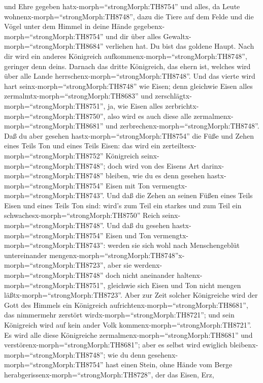 und Ehre gegeben hatx-morph=``strongMorph:TH8754''  und
alles, da Leute wohnenx-morph=``strongMorph:TH8748'', dazu die Tiere auf
dem Felde und die Vögel unter dem Himmel in deine Hände
gegebenx-morph=``strongMorph:TH8754'' und dir über alles
Gewaltx-morph=``strongMorph:TH8684'' verliehen hat. Du bist das goldene
Haupt.  Nach dir wird ein anderes Königreich
aufkommenx-morph=``strongMorph:TH8748'', geringer denn deins. Darnach
das dritte Königreich, das ehern ist, welches wird über alle Lande
herrschenx-morph=``strongMorph:TH8748''.  Und das vierte
wird hart seinx-morph=``strongMorph:TH8748'' wie Eisen; denn gleichwie
Eisen alles zermalmtx-morph=``strongMorph:TH8683'' und
zerschlägtx-morph=``strongMorph:TH8751'', ja, wie Eisen alles
zerbrichtx-morph=``strongMorph:TH8750'', also wird es auch diese alle
zermalmenx-morph=``strongMorph:TH8681'' und
zerbrechenx-morph=``strongMorph:TH8748''.  Daß du aber
gesehen hastx-morph=``strongMorph:TH8754'' die Füße und Zehen eines
Teils Ton und eines Teils Eisen: das wird ein
zerteiltesx-morph=``strongMorph:TH8752'' Königreich
seinx-morph=``strongMorph:TH8748''; doch wird von des Eisens Art
darinx-morph=``strongMorph:TH8748'' bleiben, wie du es denn gesehen
hastx-morph=``strongMorph:TH8754'' Eisen mit Ton
vermengtx-morph=``strongMorph:TH8743''.  Und daß die Zehen
an seinen Füßen eines Teils Eisen und eines Teils Ton sind: wird's zum
Teil ein starkes und zum Teil ein
schwachesx-morph=``strongMorph:TH8750'' Reich
seinx-morph=``strongMorph:TH8748''.  Und daß du gesehen
hastx-morph=``strongMorph:TH8754'' Eisen und Ton
vermengtx-morph=``strongMorph:TH8743'': werden sie sich wohl nach
Menschengeblüt untereinander
mengenx-morph=``strongMorph:TH8748''x-morph=``strongMorph:TH8723'', aber
sie werdenx-morph=``strongMorph:TH8748'' doch nicht aneinander
haltenx-morph=``strongMorph:TH8751'', gleichwie sich Eisen und Ton nicht
mengen läßtx-morph=``strongMorph:TH8723''.  Aber zur Zeit
solcher Königreiche wird der Gott des Himmels ein Königreich
aufrichtenx-morph=``strongMorph:TH8681'', das nimmermehr zerstört
wirdx-morph=``strongMorph:TH8721''; und sein Königreich wird auf kein
ander Volk kommenx-morph=``strongMorph:TH8721''. Es wird alle diese
Königreiche zermalmenx-morph=``strongMorph:TH8681'' und
verstörenx-morph=``strongMorph:TH8681''; aber es selbst wird ewiglich
bleibenx-morph=``strongMorph:TH8748'';  wie du denn
gesehenx-morph=``strongMorph:TH8754'' hast einen Stein, ohne Hände vom
Berge herabgerissenx-morph=``strongMorph:TH8728'', der das Eisen, Erz,
